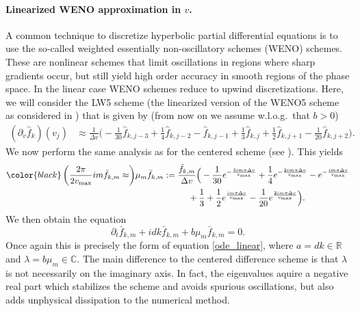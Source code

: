 \paragraph{Linearized WENO approximation in $v$.\\} 

A common technique to discretize hyperbolic partial differential equations is to use the so-called weighted essentially non-oscillatory schemes (WENO) schemes. These are nonlinear schemes that limit oscillations in regions where sharp gradients occur, but still yield high order accuracy in smooth regions of the phase space. In the linear case WENO schemes reduce to upwind discretizations. Here, we will consider the LW5 scheme (the linearized version of the WENO5 scheme as considered in \cite{baldauf, lunet, motamed, wang}) that is given by (from now on we assume w.l.o.g.~that $b>0$)
\begin{align*}
(\partial_v \hat{f}_k)(v_j) &\approx \frac{1}{\Delta v}\Big(-\frac{1}{30} \hat{f}_{k,j-3} +\frac{1}{4} \hat{f}_{k,j-2} -\hat{f}_{k,j-1} + \frac{1}{3} \hat{f}_{k,j} +\frac{1}{2} \hat{f}_{k,j+1} - \frac{1}{20} \hat{f}_{k,j+2}\Big). 
\end{align*}
We now perform the same analysis as for the centered scheme (see \cite{baldauf, fov}). This yields
\begin{align}
  {\color{black} \left( \frac{2\pi }{2 v_{\max}}  i m \bar{f}_{k, m} \approx \right)}
   \mu_m \bar{f}_{k, m} &:= \frac{\bar{f}_{k,m}}{\Delta v}\Big(-\frac{1}{30} e^{-\frac{3i m\pi \Delta v}{v_{\max}}} +\frac{1}{4} e^{-\frac{2i m \pi \Delta v}{v_{\max}}} -e^{-\frac{i m \pi \Delta v}{v_{\max}}}  \nonumber\\
&\hspace{1cm}+ \frac{1}{3}  +\frac{1}{2} e^{\frac{i m \pi \Delta v}{v_{\max}}} - \frac{1}{20} e^{\frac{2i m \pi \Delta v}{v_{\max}}}\Big). 
\label{lw5symbol}
\end{align}
We then obtain the equation 
\begin{equation}
	\label{discrete_linear_transport_weno}
	\partial_t \bar{f}_{k,m} + i dk\bar{f}_{k,m} +b \mu_m \bar{f}_{k,m}= 0.
\end{equation}
Once again this is precisely the form of equation \eqref{ode_linear}, where $a=dk\in\mathbb{R}$ and $\lambda=b\mu_m \in\mathbb{C}$. The main difference to the centered difference scheme is that $\lambda$ is not necessarily on the imaginary axis. In fact, the eigenvalues aquire a negative real part which stabilizes the scheme and avoids spurious oscillations, but also adds unphysical dissipation to the numerical method.

